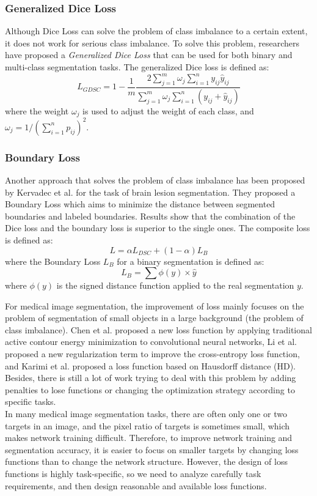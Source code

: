 \subsubsection{Generalized Dice Loss}
Although Dice Loss can solve the problem of class imbalance to a certain extent,
it does not work for serious class imbalance. To solve this problem, researchers
have proposed a \emph{Generalized Dice Loss} that can be used for both binary
and multi-class segmentation tasks. The generalized Dice loss is defined as:
$$
L_{GDSC} = 1 - \frac{1}{m}\frac{2\sum_{j=1}^{m} \omega_j
\sum_{i=1}^{n}y_{ij}\hat{y}_{ij}}{\sum_{j=1}^{m}\omega_j\sum_{i=1}^{n}(y_{ij} +
\hat{y}_{ij})}
$$
where the weight $\omega_j$ is used to adjust the weight of each class, and $\omega_j = 1/(\sum_{i=1}^{n}p_{ij})^2$.

\subsubsection{Boundary Loss}
Another approach that solves the problem of class imbalance has been proposed by
Kervadec et al. for the task of brain lesion segmentation. They proposed a
Boundary Loss which aims to minimize the distance between segmented boundaries
and labeled boundaries. Results show that the combination of the Dice loss and
the boundary loss is superior to the single ones. The composite loss is defined
as:
$$
L = \alpha L_{DSC} + (1 - \alpha) L_{B}
$$
where the Boundary Loss $L_{B}$ for a binary segmentation is defined as:
$$
L_{B} = \sum \phi(y) \times \hat{y}
$$
where $\phi(y)$ is the signed distance function applied to the real segmentation $y$.

\par
For medical image segmentation, the improvement of loss mainly focuses on the
problem of segmentation of small objects in a large background (the problem of
class imbalance). Chen et al. proposed a new loss function by applying
traditional active contour energy minimization to convolutional neural networks,
Li et al. proposed a new regularization term to improve the cross-entropy loss
function, and Karimi et al. proposed a loss function based on Hausdorff
distance (HD). Besides, there is still a lot of work trying to deal with this
problem by adding penalties to lose functions or changing the optimization
strategy according to specific tasks.\\
In many medical image segmentation tasks, there are often only one or two
targets in an image, and the pixel ratio of targets is sometimes small, which
makes network training difficult. Therefore, to improve network training and
segmentation accuracy, it is easier to focus on smaller targets by changing loss
functions than to change the network structure. However, the design of loss
functions is highly task-specific, so we need to analyze carefully task
requirements, and then design reasonable and available loss functions.

